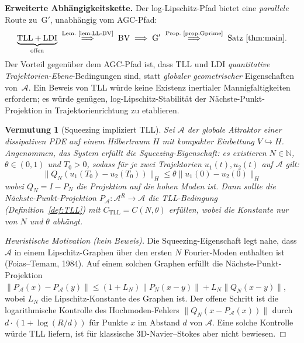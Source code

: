 \documentclass[12pt,a4paper]{article}
\theoremstyle{definition}
\theoremstyle{plain}
\newtheorem{conjecture}[definition]{Vermutung}
\theoremstyle{remark}
\begin{document}
\medskip\noindent
\textbf{Erweiterte Abhängigkeitskette.}\;
Der log-Lipschitz-Pfad bietet eine \emph{parallele} Route zu~G$'$,
unabhängig vom AGC-Pfad:
\[
  \underbrace{\textup{TLL} + \textup{LDI}}_{\text{offen}}
  \;\overset{\text{Lem.~\ref{lem:LL-BV}}}{\Longrightarrow}\;
  \textup{BV}
  \;\Longrightarrow\;
  \textup{G}'
  \;\overset{\text{Prop.~\ref{prop:Gprime}}}{\Longrightarrow}\;
  \textup{Satz~\ref{thm:main}}.
\]
Der Vorteil gegenüber dem AGC-Pfad ist, dass TLL und LDI
\emph{quantitative Trajektorien-Ebene}-Bedingungen sind, statt
\emph{globaler geometrischer} Eigenschaften von~$\mathcal{A}$.
Ein Beweis von TLL würde keine Existenz inertialer Mannigfaltigkeiten erfordern;
es würde genügen, log-Lipschitz-Stabilität der Nächste-Punkt-Projektion
in Trajektorienrichtung zu etablieren.

\begin{conjecture}[Squeezing impliziert TLL]\label{conj:squeezing-tll}
Sei $\mathcal{A}$ der globale Attraktor einer dissipativen PDE auf einem Hilbertraum $H$ mit kompakter Einbettung $V \hookrightarrow H$. Angenommen, das System erf\"ullt die \emph{Squeezing-Eigenschaft}: es existieren $N \in \mathbb{N}$, $\theta \in (0,1)$ und $T_0 > 0$, sodass f\"ur je zwei Trajektorien $u_1(t), u_2(t)$ auf $\mathcal{A}$ gilt:
\begin{equation}\label{eq:squeezing}
  \|Q_N(u_1(T_0) - u_2(T_0))\|_H \leq \theta \|u_1(0) - u_2(0)\|_H
\end{equation}
wobei $Q_N = I - P_N$ die Projektion auf die hohen Moden ist. Dann sollte die N\"achste-Punkt-Projektion $P_\mathcal{A}: \mathcal{A}^R \to \mathcal{A}$ die TLL-Bedingung (Definition~\ref{def:TLL}) mit $C_{\mathrm{TLL}} = C(N, \theta)$ erf\"ullen, wobei die Konstante nur von $N$ und $\theta$ abh\"angt.
\end{conjecture}

\begin{proof}[Heuristische Motivation (kein Beweis)]
Die Squeezing-Eigenschaft legt nahe, dass $\mathcal{A}$ in einem Lipschitz-Graphen \"uber den ersten $N$ Fourier-Moden enthalten ist (Foias--Temam, 1984). Auf einem solchen Graphen erf\"ullt die N\"achste-Punkt-Projektion
$\|P_\mathcal{A}(x) - P_\mathcal{A}(y)\| \leq (1 + L_N) \|P_N(x - y)\| + L_N \|Q_N(x - y)\|$,
wobei $L_N$ die Lipschitz-Konstante des Graphen ist. Der offene Schritt ist die logarithmische Kontrolle des Hochmoden-Fehlers $\|Q_N(x - P_\mathcal{A}(x))\|$ durch $d \cdot (1 + \log(R/d))$ f\"ur Punkte $x$ im Abstand $d$ von $\mathcal{A}$. Eine solche Kontrolle w\"urde TLL liefern, ist f\"ur klassische 3D-Navier--Stokes aber nicht bewiesen.
\end{proof}
\end{document}
